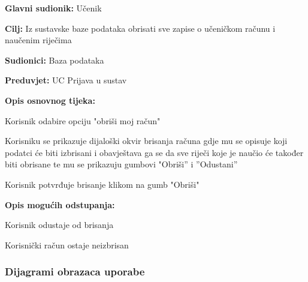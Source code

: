\noindent {}
\begin{packed_item}

	\item \textbf{Glavni sudionik: } Učenik
	\item \textbf{Cilj: } Iz sustavske baze podataka obrisati sve zapise o 
	učeničkom računu i naučenim riječima
	\item \textbf{Sudionici: } Baza podataka
	\item \textbf{Preduvjet: } UC Prijava u sustav
	\item  \textbf{Opis osnovnog tijeka:} 
	
	\item[] \begin{packed_enum}

		\item Korisnik odabire opciju "obriši moj račun"
		\item Korisniku se prikazuje dijaloški okvir brisanja računa gdje mu se opisuje koji podatci će biti izbrisani i obavještava ga se da sve riječi koje je naučio će također biti obrisane te mu se prikazuju
		gumbovi "Obriši” i ”Odustani” 
		\item Korisnik potvrđuje brisanje klikom na gumb "Obriši"
	
	\end{packed_enum}

	\item  \textbf{Opis mogućih odstupanja:}
	
	\item[] \begin{packed_item}

		\item[3.a] Korisnik odustaje od brisanja
		\item[] \begin{packed_enum}
			
			\item Korisnički račun ostaje neizbrisan
			
		\end{packed_enum}
		
	\end{packed_item}

\end{packed_item}

\eject


\subsubsection{Dijagrami obrazaca uporabe}

